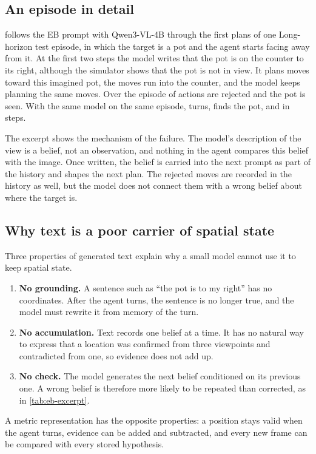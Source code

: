 \subsection{An episode in detail}
 follows the EB prompt with Qwen3-VL-4B through the first plans of one Long-horizon test
episode, in which the target is a pot and the agent starts facing away from it. At the first two steps the model
writes that the pot is on the counter to its right, although the simulator shows that the pot is not in view. It
plans moves toward this imagined pot, the moves run into the counter, and the model keeps planning the same moves.
Over the episode \tExcerptRejected{} of \tExcerptSteps{} actions are rejected and the pot is \tExcerptSeen{} seen. With
the same model on the same episode, \ours turns, finds the pot, and \tExcerptSOk{} in \tExcerptSSteps{} steps.

\begin{table}[htbp]
\centering\small
\caption[The EB prompt on one Long-horizon episode]{The first four plans of the EB prompt (Qwen3-VL-4B) on a
Long-horizon test episode whose target is a pot. ``Target in view'' comes from the simulator and is not available to
the agent; the last column counts the accepted and rejected actions of each plan.}
\label{tab:eb-excerpt}

\end{table}

The excerpt shows the mechanism of the failure. The model's description of the view is a belief, not an observation,
and nothing in the agent compares this belief with the image. Once written, the belief is carried into the next
prompt as part of the history and shapes the next plan. The rejected moves are recorded in the history as well, but
the model does not connect them with a wrong belief about where the target is.

\subsection{Why text is a poor carrier of spatial state}
Three properties of generated text explain why a small model cannot use it to keep spatial state.
\begin{enumerate}
\item \textbf{No grounding.} A sentence such as ``the pot is to my right'' has no coordinates. After the agent
turns, the sentence is no longer true, and the model must rewrite it from memory of the turn.
\item \textbf{No accumulation.} Text records one belief at a time. It has no natural way to express that a location
was confirmed from three viewpoints and contradicted from one, so evidence does not add up.
\item \textbf{No check.} The model generates the next belief conditioned on its previous one. A wrong belief is
therefore more likely to be repeated than corrected, as in \cref{tab:eb-excerpt}.
\end{enumerate}
A metric representation has the opposite properties: a position stays valid when the agent turns, evidence can be
added and subtracted, and every new frame can be compared with every stored hypothesis.

